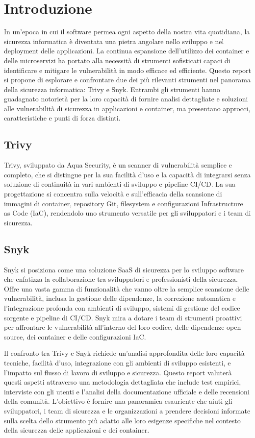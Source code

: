 \chapter{Introduzione}
In un'epoca in cui il software permea ogni aspetto della nostra vita quotidiana, la sicurezza informatica è diventata una pietra angolare nello sviluppo e nel deployment delle applicazioni. La continua espansione dell'utilizzo dei container e delle microservizi ha portato alla necessità di strumenti sofisticati capaci di identificare e mitigare le vulnerabilità in modo efficace ed efficiente. Questo report si propone di esplorare e confrontare due dei più rilevanti strumenti nel panorama della sicurezza informatica: Trivy e Snyk. Entrambi gli strumenti hanno guadagnato notorietà per la loro capacità di fornire analisi dettagliate e soluzioni alle vulnerabilità di sicurezza in applicazioni e container, ma presentano approcci, caratteristiche e punti di forza distinti.

\section{Trivy}

Trivy, sviluppato da Aqua Security, è un scanner di vulnerabilità semplice e completo, che si distingue per la sua facilità d'uso e la capacità di integrarsi senza soluzione di continuità in vari ambienti di sviluppo e pipeline CI/CD. La sua progettazione si concentra sulla velocità e sull'efficacia della scansione di immagini di container, repository Git, filesystem e configurazioni Infrastructure as Code (IaC), rendendolo uno strumento versatile per gli sviluppatori e i team di sicurezza.

\section{Snyk}

Snyk si posiziona come una soluzione SaaS di sicurezza per lo sviluppo software che enfatizza la collaborazione tra sviluppatori e professionisti della sicurezza. Offre una vasta gamma di funzionalità che vanno oltre la semplice scansione delle vulnerabilità, inclusa la gestione delle dipendenze, la correzione automatica e l'integrazione profonda con ambienti di sviluppo, sistemi di gestione del codice sorgente e pipeline di CI/CD. Snyk mira a dotare i team di strumenti proattivi per affrontare le vulnerabilità all'interno del loro codice, delle dipendenze open source, dei container e delle configurazioni IaC.

Il confronto tra Trivy e Snyk richiede un'analisi approfondita delle loro capacità tecniche, facilità d'uso, integrazione con gli ambienti di sviluppo esistenti, e l'impatto sul flusso di lavoro di sviluppo e sicurezza. Questo report valuterà questi aspetti attraverso una metodologia dettagliata che include test empirici, interviste con gli utenti e l'analisi della documentazione ufficiale e delle recensioni della comunità. L'obiettivo è fornire una panoramica esauriente che aiuti gli sviluppatori, i team di sicurezza e le organizzazioni a prendere decisioni informate sulla scelta dello strumento più adatto alle loro esigenze specifiche nel contesto della sicurezza delle applicazioni e dei container.